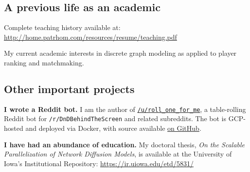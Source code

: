 \documentclass[10pt,letterpaper]{article}
\newcommand\ttt\texttt
\renewenvironment{itemize}{
  \begin{list}{}{
    \setlength{\leftmargin}{1.5em}
    \setlength{\itemsep}{0.25em}
    \setlength{\parskip}{0pt}
    \setlength{\parsep}{0.25em}
  }
}{
  \end{list}
}
\begin{document}
\subsection*{A previous life as an academic}
\begin{itemize}
  \item

  \item

  \item

  \item

  \item Complete teaching history available at: \url{http://home.patrhom.com/resources/resume/teaching.pdf}
  
  \item My current academic interests in discrete graph modeling as applied to player ranking and matchmaking.
\end{itemize}

\subsection*{Other important projects}
\begin{itemize}
  \item \textbf{I wrote a Reddit bot.} I am the author of \href{https://www.reddit.com/user/roll_one_for_me}{\ttt{/u/roll\_one\_for\_me}},
    a table-rolling Reddit bot for \ttt{/r/DnDBehindTheScreen} and related subreddits.
    The bot is GCP-hosted and deployed via Docker, with source available \href{https://github.com/PurelyApplied/roll_one_for_me/}{on GitHub}.

  \item \textbf{I have had an abundance of education.} My doctoral thesis, {\em On the Scalable Parallelization of Network Diffusion Models},
    is available at the University of Iowa's Institutional Repository:  \url{https://ir.uiowa.edu/etd/5831/}
\end{itemize}
\end{document}
